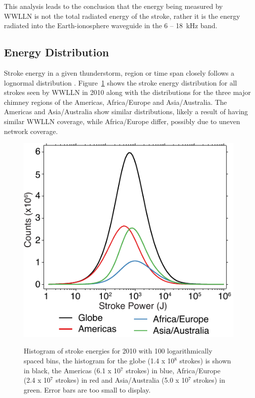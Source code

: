This analysis leads to the conclusion that the energy being measured by WWLLN is not the total radiated energy of the stroke, rather it is the energy radiated into the Earth-ionosphere waveguide in the 6 -- 18~kHz band.

\subsection{Energy Distribution}

Stroke energy in a given thunderstorm, region or time span closely follows a lognormal distribution \citep{Golde1977}.
Figure~\ref{energy:fig:distribution} shows the stroke energy distribution for all strokes seen by WWLLN in 2010 along with the distributions for the three major chimney regions of the Americas, Africa/Europe and Asia/Australia.
The Americas and Asia/Australia show similar distributions, likely a result of having similar WWLLN coverage, while Africa/Europe differ, possibly due to uneven network coverage.

\begin{figure}[ht!]
\centering
\includegraphics[scale=1]{energy/Figures/PPS_Distribution2.pdf}\\
\caption{Histogram of stroke energies for 2010 with 100 logarithmically spaced bins, the histogram for the globe (1.4 x 10$^8$ strokes) is shown in black, the Americas (6.1 x 10$^7$ strokes) in blue, Africa/Europe (2.4 x 10$^7$ strokes) in red and Asia/Australia (5.0 x 10$^7$ strokes) in green. Error bars are too small to display.}
\label{energy:fig:distribution}
\end{figure}
 
